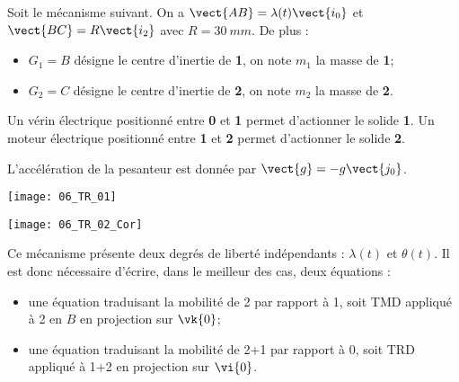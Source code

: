 \normaltrue
\correctiontrue


\setcounter{question}{0}%
\ifcorrection
\else
{}
\fi

\ifprof
\else
Soit le mécanisme suivant. On a $\vect{AB}=\lambda(t)\vect{i_0}$ et $\vect{BC}=R\vect{i_2}$ avec $R=\SI{30}{mm}$.
De plus :
\begin{itemize}
\item $G_1=B$ désigne le centre d'inertie de \textbf{1}, on note $m_1$ la masse de \textbf{1};%
\item $G_2=C$ désigne le centre d'inertie de \textbf{2}, on note $m_2$ la masse de \textbf{2}.%
\end{itemize}

Un vérin électrique positionné entre \textbf{0} et \textbf{1}  permet d'actionner le solide \textbf{1}.
Un moteur électrique positionné entre \textbf{1} et \textbf{2}  permet d'actionner le solide \textbf{2}.

L'accélération de la pesanteur est donnée par $\vect{g}=-g\vect{j_0}$.

\begin{marginfigure}
\texttt{[image: 06\_TR\_01]}
\end{marginfigure}
\fi

\ifprof
\begin{marginfigure}
\texttt{[image: 06\_TR\_02\_Cor]}
\end{marginfigure}
\else
\fi

\ifprof
Ce mécanisme présente deux degrés de liberté indépendants : $\lambda(t)$ et $\theta(t)$. Il est donc nécessaire d'écrire, dans le meilleur des cas, deux équations :
\begin{itemize}
\item une équation traduisant la mobilité de 2 par rapport à 1, soit TMD appliqué à 2 en $B$ en projection sur $\vk{0}$;
\item une équation traduisant la mobilité de 2+1 par rapport à 0, soit TRD appliqué à 1+2 en projection sur $\vi{0}$.
\end{itemize}

